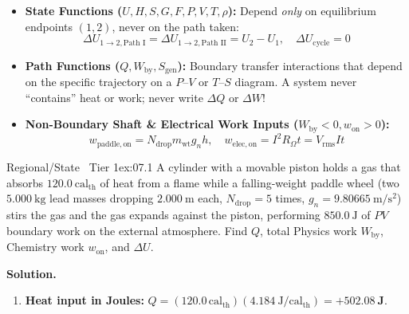 \begin{twocol}[0.49]
\begin{formulacard}
\begin{itemize}
  \item \textbf{State Functions ($U, H, S, G, F, P, V, T, \rho$):} Depend \emph{only} on equilibrium endpoints $(1, 2)$, never on the path taken:
  \begin{equation}\label{eq:07:state-fn}
    \Delta U_{1\to 2,\text{Path I}} = \Delta U_{1\to 2,\text{Path II}} = U_2 - U_1, \quad \Delta U_{\mathrm{cycle}} = 0
  \end{equation}
  \item \textbf{Path Functions ($Q, W_{\mathrm{by}}, S_{\mathrm{gen}}$):} Boundary transfer interactions that depend on the specific trajectory on a $P$--$V$ or $T$--$S$ diagram. A system never ``contains'' heat or work; never write $\Delta Q$ or $\Delta W$!
  \item \textbf{Non-Boundary Shaft \& Electrical Work Inputs ($W_{\mathrm{by}} < 0, w_{\mathrm{on}} > 0$):}
  \begin{equation}\label{eq:07:joule-work}
    w_{\mathrm{paddle,on}} = N_{\mathrm{drop}} m_{\mathrm{wt}} g_n h, \quad w_{\mathrm{elec,on}} = I^2 R_\Omega t = V_{\mathrm{rms}} I t
  \end{equation}
\end{itemize}
\end{formulacard}
\nextcol[0.49]
\begin{workedexample}{Regional/State \textbar\ Tier 1}{ex:07.1}
A cylinder with a movable piston holds a gas that absorbs $\SI{120.0}{\text{cal}_{\mathrm{th}}}$ of heat from a flame while a falling-weight paddle wheel (two $\SI{5.000}{\kilogram}$ lead masses dropping $\SI{2.000}{\meter}$ each, $N_{\mathrm{drop}} = 5$ times, $g_n = \SI{9.80665}{\meter\per\square\second}$) stirs the gas and the gas expands against the piston, performing $\SI{850.0}{\joule}$ of $PV$ boundary work on the external atmosphere. Find $Q$, total Physics work $W_{\mathrm{by}}$, Chemistry work $w_{\mathrm{on}}$, and $\Delta U$.
\par\smallskip\noindent
\textbf{Solution.}
\begin{enumerate}
  \item \textbf{Heat input in Joules:} $Q = (120.0\,\si{\text{cal}_{\mathrm{th}}})(\SI{4.184}{\joule\per\text{cal}_{\mathrm{th}}}) = \mathbf{+\SI{502.08}{\joule}}$.

\end{enumerate}
\end{workedexample}
\end{twocol}
